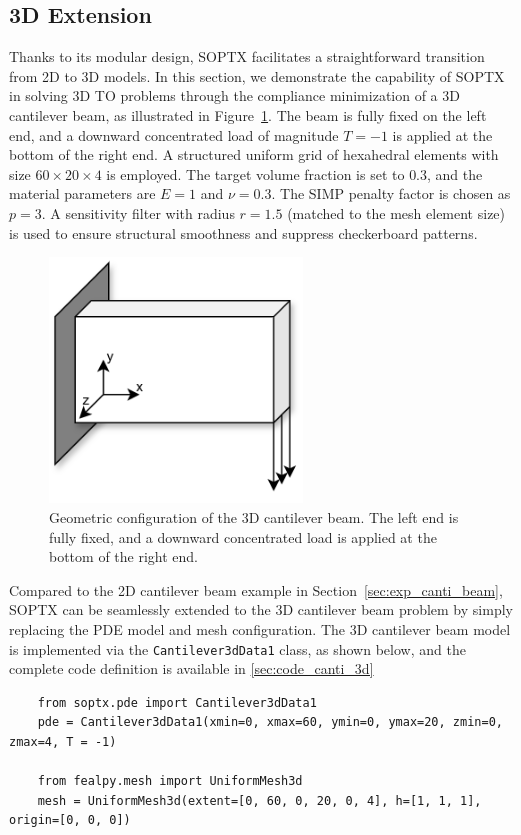\documentclass[mathpazo]{cicp}
\begin{document}
\subsection{3D Extension}\label{sec:exp_canti3d}
Thanks to its modular design, SOPTX facilitates a straightforward transition from 2D to 3D models. In this section, we demonstrate the capability of SOPTX in solving 3D TO problems through the compliance minimization of a 3D cantilever beam, as illustrated in Figure~\ref{fig:cantilever_3d}. The beam is fully fixed on the left end, and a downward concentrated load of magnitude $T=-1$ is applied at the bottom of the right end. A structured uniform grid of hexahedral elements with size $60\times20\times4$ is employed. The target volume fraction is set to $0.3$, and the material parameters are $E = 1$ and $\nu = 0.3$. The SIMP penalty factor is chosen as $p=3$. A sensitivity filter with radius $r=1.5$ (matched to the mesh element size) is used to ensure structural smoothness and suppress checkerboard patterns.
\begin{figure}[htp]
	\centering
	\includegraphics[width=0.6\textwidth]{figures/cantilever_3d.png}
	\caption{Geometric configuration of the 3D cantilever beam. The left end is fully fixed, and a downward concentrated load is applied at the bottom of the right end.}
	\label{fig:cantilever_3d}
\end{figure}

Compared to the 2D cantilever beam example in Section~\ref{sec:exp_canti_beam}, SOPTX can be seamlessly extended to the 3D cantilever beam problem by simply replacing the PDE model and mesh configuration. The 3D cantilever beam model is implemented via the \texttt{Cantilever3dData1} class, as shown below, and the complete code definition is available in \ref{sec:code_canti_3d}
\begin{lstlisting}
	from soptx.pde import Cantilever3dData1
	pde = Cantilever3dData1(xmin=0, xmax=60, ymin=0, ymax=20, zmin=0, zmax=4, T = -1)
	
	from fealpy.mesh import UniformMesh3d
	mesh = UniformMesh3d(extent=[0, 60, 0, 20, 0, 4], h=[1, 1, 1], origin=[0, 0, 0])
\end{lstlisting}
\end{document}
